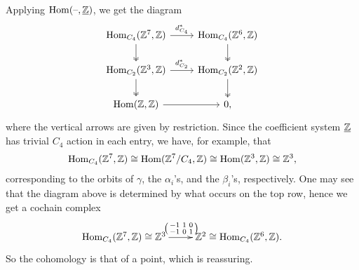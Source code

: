 \begin{exm}
Applying $\operatorname{Hom}(\text{--},\underline{\mathbb Z})$, we get the diagram
\[ \begin{tikzcd}
    \Hom_{C_4}(\Z^7, \Z) \rar["d_{C_4}^\ast" above]\dar[two heads] & \Hom_{C_4}(\Z^6, \Z)\dar[two heads] \\
    \Hom_{C_2}(\Z^3, \Z)\rar["d_{C_2}^\ast" above]\dar[two heads] & \Hom_{C_2}(\Z^2, \Z)\dar[two heads] \\
    \Hom(\Z,\Z) \rar & 0,
\end{tikzcd} \]
where the vertical arrows are given by restriction. Since the coefficient system $\underline{\mathbb Z}$ has trivial $C_4$ action in each entry, we have, for example, that
\begin{align*}
    \operatorname{Hom}_{C_4}(\mathbb Z^7, \mathbb Z) \cong \operatorname{Hom}(\mathbb Z^7/C_4, \mathbb Z) \cong \operatorname{Hom}(\mathbb Z^3,\mathbb Z) \cong \mathbb Z^3,
\end{align*}
corresponding to the orbits of $\gamma$, the $\alpha_i$'s, and the $\beta_i$'s, respectively. One may see that the diagram above is determined by what occurs on the top row, hence we get a cochain complex
\[\xymatrix{
	\Hom_{C_4}(\Z^7,\Z) \cong \Z^3\ar[r]^{\begin{psmallmatrix*}-1 & 1 & 0\\-1 & 0 & 1\end{psmallmatrix*}} & \Z^2 \cong \Hom_{C_4}(\Z^6, \Z).
}\]
So the cohomology is that of a point, which is reassuring.
\end{exm}

